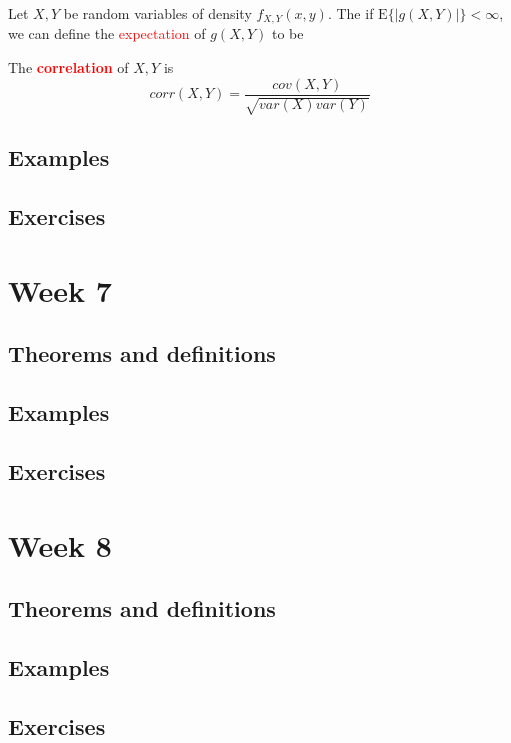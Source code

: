 \documentclass[12pt,a4paper]{article}
\newcommand{\E}{\ensuremath{\mathrm{E}}}
\begin{document}
 Let $X,Y$ be random variables of density $f_{X,Y}(x,y)$. The if $\E\{|g(X,Y)|\} < \infty$, we can define the \textcolor{red}{expectation} of $g(X,Y)$ to be  \todo{}

 The \textbf{\textcolor{red}{correlation}} of $X,Y$ is 
\begin{equation}
    corr(X,Y) = \frac{cov(X,Y)}{\sqrt{var(X)var(Y)}}
\end{equation}

\subsection{Examples}
\subsection{Exercises}
\section{Week 7}
\subsection{Theorems and definitions}
\subsection{Examples}
\subsection{Exercises}
\section{Week 8}
\subsection{Theorems and definitions}
\subsection{Examples}
\subsection{Exercises}
\end{document}
